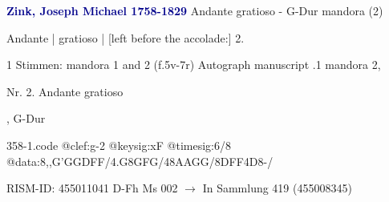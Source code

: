 \documentclass[twocolumn]{book}
\begin{document}
\newline \par \vspace{7pt} \textcolor{darkblue}{\textbf{Zink, Joseph Michael  1758-1829}}
\newline Andante gratioso - G-Dur
\newline mandora (2)
\newline \begin{itshape} Andante | gratioso | [left before the accolade:] 2.\end{itshape} 
\newline \textcolor{darkblue}{}  1 Stimmen: mandora 1 and 2  (f.5v-7r)
\newline Autograph manuscript
.1  mandora 2, \begin{itshape}Nr. 2. Andante gratioso\end{itshape}, G-Dur  
\begin{filecontents*}{358-1.code}
@clef:g-2
@keysig:xF
@timesig:6/8
@data:8,,G'GGDFF/4.G8GFG/48AAGG/8DFF4D8-/
\end{filecontents*}
\newline
%
\newline RISM-ID: 455011041
\newline D-Fh  Ms 002
\newline $\rightarrow$ In Sammlung 419 (455008345)
      
\end{document}
